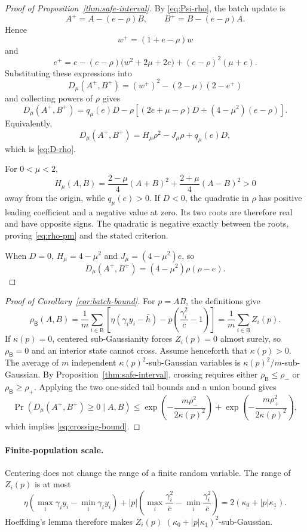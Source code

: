 \documentclass[11pt]{article}
\begin{document}
\begin{proof}[Proof of Proposition~\ref{thm:safe-interval}]
By \eqref{eq:Psi-rho}, the batch update is
\[
A^+=A-(e-\rho)B,
\qquad
B^+=B-(e-\rho)A.
\]
Hence
\[
w^+=(1+e-\rho)w
\]
and
\[
e^+
=e-(e-\rho)\bigl(w^2+2\mu+2e\bigr)
 +(e-\rho)^2(\mu+e).
\]
Substituting these expressions into
\[
D_\mu(A^+,B^+)=(w^+)^2-(2-\mu)(2-e^+)
\]
and collecting powers of \(\rho\) gives
\[
D_\mu(A^+,B^+)
=q_\mu(e)D
-\rho\left[
(2e+\mu-\rho)D+(4-\mu^2)(e-\rho)
\right].
\]
Equivalently,
\[
D_\mu(A^+,B^+)
=H_\mu\rho^2-J_\mu\rho+q_\mu(e)D,
\]
which is \eqref{eq:D-rho}.

For \(0<\mu<2\),
\[
H_\mu(A,B)
=\frac{2-\mu}{4}(A+B)^2
+\frac{2+\mu}{4}(A-B)^2>0
\]
away from the origin, while \(q_\mu(e)>0\).  If \(D<0\), the quadratic in
\(\rho\) has positive leading coefficient and a negative value at zero.  Its
two roots are therefore real and have opposite signs.  The quadratic is
negative exactly between the roots, proving \eqref{eq:rho-pm} and the stated
criterion.

When \(D=0\), \(H_\mu=4-\mu^2\) and
\(J_\mu=(4-\mu^2)e\), so
\[
D_\mu(A^+,B^+)=(4-\mu^2)\rho(\rho-e).
\]
\end{proof}

\begin{proof}[Proof of Corollary~\ref{cor:batch-bound}]
For \(p=AB\), the definitions give
\[
\rho_{\mathsf B}(A,B)
=\frac1m\sum_{i\in\mathsf B}
\left[
\eta(\gamma_i y_i-\bar h)
-p\left(\frac{\gamma_i^2}{\bar c}-1\right)
\right]
=\frac1m\sum_{i\in\mathsf B}Z_i(p).
\]
If \(\kappa(p)=0\), centered sub-Gaussianity forces \(Z_i(p)=0\) almost
surely, so \(\rho_{\mathsf B}=0\) and an interior state cannot cross.
Assume henceforth that \(\kappa(p)>0\).
The average of \(m\) independent
\(\kappa(p)^2\)-sub-Gaussian variables is
\(\kappa(p)^2/m\)-sub-Gaussian.  By
Proposition~\ref{thm:safe-interval}, crossing requires either
\(\rho_{\mathsf B}\le\rho_-\) or
\(\rho_{\mathsf B}\ge\rho_+\).  Applying the two one-sided tail bounds and
a union bound gives
\[
\Pr(D_\mu(A^+,B^+)\ge0\mid A,B)
\le
\exp\left(-\frac{m\rho_-^2}{2\kappa(p)^2}\right)
+
\exp\left(-\frac{m\rho_+^2}{2\kappa(p)^2}\right),
\]
which implies \eqref{eq:crossing-bound}.
\end{proof}

\paragraph{Finite-population scale.} Centering does not change the range of a finite random variable.  The range
of \(Z_i(p)\) is at most
\[
\eta\left(\max_i\gamma_i y_i-\min_i\gamma_i y_i\right)
+|p|\left(
\max_i\frac{\gamma_i^2}{\bar c}
-\min_i\frac{\gamma_i^2}{\bar c}
\right)
=2(\kappa_0+|p|\kappa_1).
\]
Hoeffding's lemma therefore makes \(Z_i(p)\)
\((\kappa_0+|p|\kappa_1)^2\)-sub-Gaussian.
\end{document}
